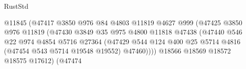\begin{lexlean}{RustStd}
\begin{coremodule}
                                                  @11845
                                                  (@47417
                                                    @3850
                                                    @976
                                                    @84
                                                    @4803
                                                    @11819
                                                    @4627
                                                    @999
                                                    (@47425
                                                      @3850
                                                      @976
                                                      @11819
                                                      (@47430
                                                        @3849
                                                        @35
                                                        @975
                                                        @4800
                                                        @11818
                                                        @47438
                                                        (@47440
                                                          @546
                                                          @22
                                                          @974
                                                          @4854
                                                          @5716
                                                          @27364
                                                          (@47429
                                                            @544
                                                            @124
                                                            @400
                                                            @25
                                                            @5714
                                                            @4816
                                                            (@47454 @543 @5714 @19548 @19552)
                                                            @47460))))
                                                    @18566
                                                    @18569
                                                    @18572
                                                    @18575
                                                    @17612)
                                                  (@47474

\end{coremodule}
\end{lexlean}
